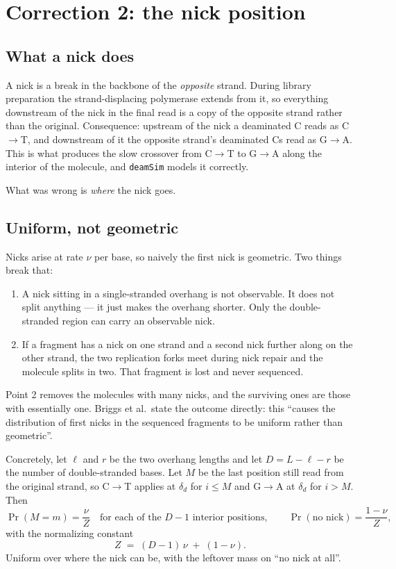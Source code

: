 \documentclass[11pt,a4paper]{article}
\begin{document}
\section{Correction 2: the nick position}

\subsection{What a nick does}

A nick is a break in the backbone of the \emph{opposite} strand. During library
preparation the strand-displacing polymerase extends from it, so everything downstream
of the nick in the final read is a copy of the opposite strand rather than the
original. Consequence: upstream of the nick a deaminated C reads as C$\to$T, and
downstream of it the opposite strand's deaminated Cs read as G$\to$A. This is what
produces the slow crossover from C$\to$T to G$\to$A along the interior of the
molecule, and \texttt{deamSim} models it correctly.

What was wrong is \emph{where} the nick goes.

\subsection{Uniform, not geometric}

Nicks arise at rate $\nu$ per base, so naively the first nick is geometric. Two things
break that:

\begin{enumerate}
\item A nick sitting in a single-stranded overhang is not observable. It does not
      split anything --- it just makes the overhang shorter. Only the double-stranded
      region can carry an observable nick.
\item If a fragment has a nick on one strand and a second nick further along on the
      other strand, the two replication forks meet during nick repair and the molecule
      splits in two. That fragment is lost and never sequenced.
\end{enumerate}

Point 2 removes the molecules with many nicks, and the surviving ones are those with
essentially one. Briggs et al.\ state the outcome directly: this ``causes the
distribution of first nicks in the sequenced fragments to be uniform rather than
geometric''.

Concretely, let $\ell$ and $r$ be the two overhang lengths and let
$D = L - \ell - r$ be the number of double-stranded bases. Let $M$ be the last
position still read from the original strand, so C$\to$T applies at $\delta_d$ for
$i \leq M$ and G$\to$A at $\delta_d$ for $i > M$. Then
\begin{equation}
\Pr(M = m) = \frac{\nu}{Z} \quad \text{for each of the } D-1 \text{ interior positions},
\qquad
\Pr(\text{no nick}) = \frac{1-\nu}{Z} ,
\end{equation}
with the normalizing constant
\begin{equation}
Z \;=\; (D-1)\,\nu \;+\; (1 - \nu) .
\end{equation}
Uniform over where the nick can be, with the leftover mass on ``no nick at all''.
\end{document}
